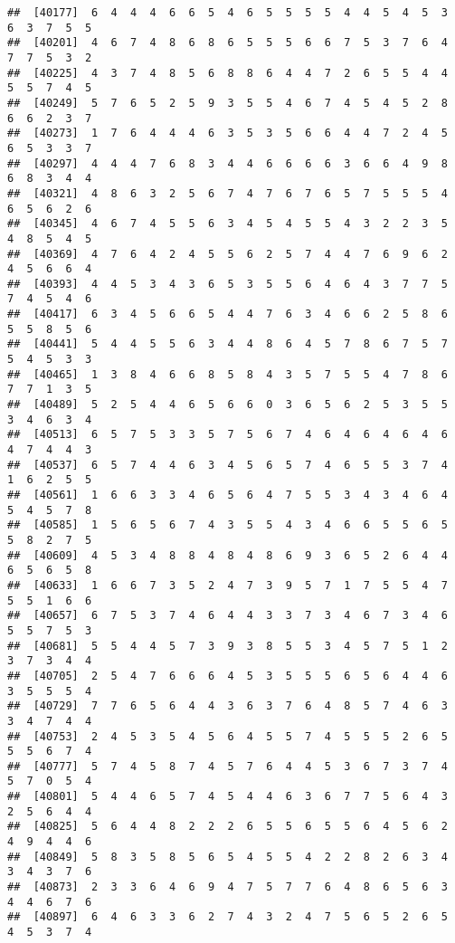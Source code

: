 \documentclass[
]{book}
\begin{document}
\begin{verbatim}
##  [40177]  6  4  4  4  6  6  5  4  6  5  5  5  5  4  4  5  4  5  3  6  3  7  5  5
##  [40201]  4  6  7  4  8  6  8  6  5  5  5  6  6  7  5  3  7  6  4  7  7  5  3  2
##  [40225]  4  3  7  4  8  5  6  8  8  6  4  4  7  2  6  5  5  4  4  5  5  7  4  5
##  [40249]  5  7  6  5  2  5  9  3  5  5  4  6  7  4  5  4  5  2  8  6  6  2  3  7
##  [40273]  1  7  6  4  4  4  6  3  5  3  5  6  6  4  4  7  2  4  5  6  5  3  3  7
##  [40297]  4  4  4  7  6  8  3  4  4  6  6  6  6  3  6  6  4  9  8  6  8  3  4  4
##  [40321]  4  8  6  3  2  5  6  7  4  7  6  7  6  5  7  5  5  5  4  6  5  6  2  6
##  [40345]  4  6  7  4  5  5  6  3  4  5  4  5  5  4  3  2  2  3  5  4  8  5  4  5
##  [40369]  4  7  6  4  2  4  5  5  6  2  5  7  4  4  7  6  9  6  2  4  5  6  6  4
##  [40393]  4  4  5  3  4  3  6  5  3  5  5  6  4  6  4  3  7  7  5  7  4  5  4  6
##  [40417]  6  3  4  5  6  6  5  4  4  7  6  3  4  6  6  2  5  8  6  5  5  8  5  6
##  [40441]  5  4  4  5  5  6  3  4  4  8  6  4  5  7  8  6  7  5  7  5  4  5  3  3
##  [40465]  1  3  8  4  6  6  8  5  8  4  3  5  7  5  5  4  7  8  6  7  7  1  3  5
##  [40489]  5  2  5  4  4  6  5  6  6  0  3  6  5  6  2  5  3  5  5  3  4  6  3  4
##  [40513]  6  5  7  5  3  3  5  7  5  6  7  4  6  4  6  4  6  4  6  4  7  4  4  3
##  [40537]  6  5  7  4  4  6  3  4  5  6  5  7  4  6  5  5  3  7  4  1  6  2  5  5
##  [40561]  1  6  6  3  3  4  6  5  6  4  7  5  5  3  4  3  4  6  4  5  4  5  7  8
##  [40585]  1  5  6  5  6  7  4  3  5  5  4  3  4  6  6  5  5  6  5  5  8  2  7  5
##  [40609]  4  5  3  4  8  8  4  8  4  8  6  9  3  6  5  2  6  4  4  6  5  6  5  8
##  [40633]  1  6  6  7  3  5  2  4  7  3  9  5  7  1  7  5  5  4  7  5  5  1  6  6
##  [40657]  6  7  5  3  7  4  6  4  4  3  3  7  3  4  6  7  3  4  6  5  5  7  5  3
##  [40681]  5  5  4  4  5  7  3  9  3  8  5  5  3  4  5  7  5  1  2  3  7  3  4  4
##  [40705]  2  5  4  7  6  6  6  4  5  3  5  5  5  6  5  6  4  4  6  3  5  5  5  4
##  [40729]  7  7  6  5  6  4  4  3  6  3  7  6  4  8  5  7  4  6  3  3  4  7  4  4
##  [40753]  2  4  5  3  5  4  5  6  4  5  5  7  4  5  5  5  2  6  5  5  5  6  7  4
##  [40777]  5  7  4  5  8  7  4  5  7  6  4  4  5  3  6  7  3  7  4  5  7  0  5  4
##  [40801]  5  4  4  6  5  7  4  5  4  4  6  3  6  7  7  5  6  4  3  2  5  6  4  4
##  [40825]  5  6  4  4  8  2  2  2  6  5  5  6  5  5  6  4  5  6  2  4  9  4  4  6
##  [40849]  5  8  3  5  8  5  6  5  4  5  5  4  2  2  8  2  6  3  4  3  4  3  7  6
##  [40873]  2  3  3  6  4  6  9  4  7  5  7  7  6  4  8  6  5  6  3  4  4  6  7  6
##  [40897]  6  4  6  3  3  6  2  7  4  3  2  4  7  5  6  5  2  6  5  4  5  3  7  4

\end{verbatim}
\end{document}
